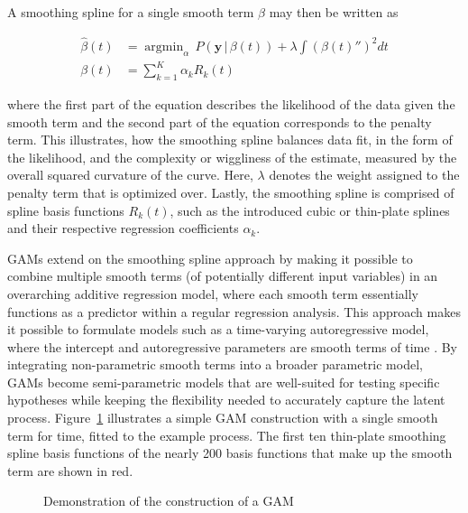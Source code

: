 \documentclass[man, floatsintext]{apa7}
\DeclareMathOperator*{\argmin}{argmin}
\begin{document}
A smoothing spline for a single smooth term $\beta$ may then be written as

\begin{equation}
  \begin{aligned}
    \hat{\beta}(t) & = \argmin_\alpha \, P(\textbf{y} \, | \, \beta(t)) +
    \lambda \int {(\beta(t)'')}^2 dt                                      \\
    \beta(t)       & = \sum^K_{k = 1} \alpha_k R_k(t)
  \end{aligned}
\end{equation}

\noindent where the first part of the equation describes the likelihood
of the data given the smooth term and the second part of the equation
corresponds to the penalty term. This illustrates, how the smoothing spline
balances data fit, in the form of the likelihood, and the complexity or
wiggliness of the estimate, measured by the overall squared curvature of the
curve. Here, $\lambda$ denotes the weight assigned to the penalty term that is
optimized over. Lastly, the smoothing spline is
comprised of spline basis functions $R_k(t)$, such as the introduced cubic or
thin-plate splines and their respective regression coefficients $\alpha_k$.

GAMs extend on the smoothing spline approach by making it possible to combine
multiple smooth terms (of potentially different input variables) in an
overarching additive regression model, where each
smooth term essentially functions as a predictor within a regular regression
analysis. This approach makes it possible to formulate models such
as a time-varying autoregressive model, where the intercept and autoregressive
parameters are smooth terms of time \parencite{bringmann_changing_2017,
  bringmann_modeling_2015}. By integrating non-parametric smooth terms into a
broader parametric model, GAMs become semi-parametric models that are
well-suited for testing specific hypotheses while keeping the flexibility
needed to accurately capture the latent process. Figure~\ref{fig:gam_dem}
illustrates a simple GAM construction with a single smooth term for time,
fitted to the example process. The first ten thin-plate smoothing spline basis
functions of the nearly 200 basis functions that make up the smooth term are
shown in red.

\begin{figure}[!t]
  \caption{Demonstration of the construction of a GAM}
  \label{fig:gam_dem}
\end{figure}
\end{document}
